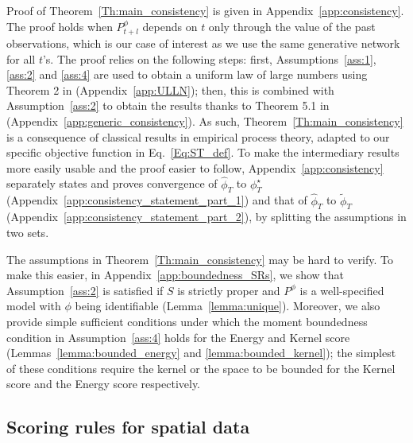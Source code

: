 \documentclass[twoside,11pt]{article}
\begin{document}
	
	Proof of Theorem~\ref{Th:main_consistency} is given in Appendix~\ref{app:consistency}. The proof holds when $P^\phi_{t+l}$ depends on $ t $ only through the value of the past observations, which is our case of interest as we use the same generative network for all $ t $'s. The proof relies on the following steps: first, Assumptions~\ref{ass:1}, \ref{ass:2} and \ref{ass:4} are used to obtain a uniform law of large numbers using Theorem 2 in \cite{potscher1989uniform} (Appendix~\ref{app:ULLN}); then, this is combined with Assumption~\ref{ass:2} to obtain the results thanks to Theorem 5.1 in \cite{skouras1998optimal} (Appendix~\ref{app:generic_consistency}). As such, Theorem~\ref{Th:main_consistency} is a consequence of classical results in empirical process theory, adapted to our specific objective function in Eq.~\eqref{Eq:ST_def}. To make the intermediary results more easily usable and the proof easier to follow, Appendix~\ref{app:consistency} separately states and proves convergence of $ \hat \phi_T $ to $ \phi^\star_T $ (Appendix~\ref{app:consistency_statement_part_1}) and that of $ \hat \phi_T $ to $ \tilde \phi_T $ (Appendix~\ref{app:consistency_statement_part_2}), by splitting the assumptions in two sets.
	
	
	The assumptions in Theorem~\ref{Th:main_consistency} may be hard to verify. To make this easier, in Appendix~\ref{app:boundedness_SRs}, we show that Assumption~\ref{ass:2} is satisfied if $ S $ is strictly proper and $ P^\phi $ is a well-specified model with $ \phi $ being identifiable (Lemma~\ref{lemma:unique}). Moreover, we also provide simple sufficient conditions under which the moment boundedness condition in Assumption~\ref{ass:4} holds for the Energy and Kernel score (Lemmas~\ref{lemma:bounded_energy} and \ref{lemma:bounded_kernel}); the simplest of these conditions require the kernel or the space to be bounded for the Kernel score and the Energy score respectively.
	
	
	
	
	
	
	
	
	
	
	
	
	
	
	
	
	
	
	
	
	
	
	
	
	
	\subsection{Scoring rules for spatial data}\label{sec:SR_spatial}
	
\end{document}
